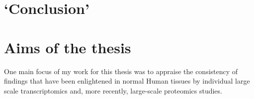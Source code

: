 \begin{comment}
\begin{itemize}
            \item{Different samples}
            \item{Technology: wet lab but also software: Rupgrade, \ldots}
            \item{missing meta-data}
        \end{itemize}
    \subsection{Main concerns}
        \subsubsection{Detection}
        \subsubsection{Quantification}
    \subsection{Consistency through biological layers}
\end{comment}





\section{`Conclusion'}

\begin{comment}
\Rnaseq\ as \Dnaseq\ needs many corrections as to prevent biases in the downstream
analysis. However, due to the dynamic component of the transcriptome
contrarily to the genome, while it is possible to apply the corrections in
\Dnaseq\ and then analyse the data \mycite{dnaseqCorr},
in \Rnaseq, corrections are already part of
the analysis and requires often as much skills than flair. It is possible that
future protocols will overcome this issue.
\end{comment}

\section{Aims of the thesis}

One main focus of my work for this thesis was to appraise the
consistency of findings that have been enlightened in normal Human tissues by
individual large scale transcriptomics and, more recently, large-scale
proteomics studies.

